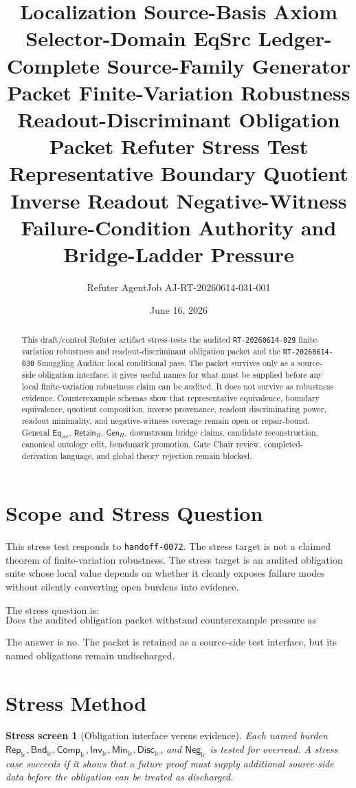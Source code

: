 \documentclass[11pt]{article}
\title{\textbf{Localization Source-Basis Axiom Selector-Domain EqSrc Ledger-Complete Source-Family Generator Packet Finite-Variation Robustness Readout-Discriminant Obligation Packet Refuter Stress Test}\\[0.35em]
\large Representative Boundary Quotient Inverse Readout Negative-Witness Failure-Condition Authority and Bridge-Ladder Pressure}
\author{Refuter AgentJob AJ-RT-20260614-031-001}
\date{June 16, 2026}
\newcommand{\EqSrc}{\mathsf{Eq}_{\mathrm{src}}}
\newcommand{\RepLC}{\mathsf{Rep}_{\mathrm{lc}}}
\newcommand{\BndLC}{\mathsf{Bnd}_{\mathrm{lc}}}
\newcommand{\CompLC}{\mathsf{Comp}_{\mathrm{lc}}}
\newcommand{\InvLC}{\mathsf{Inv}_{\mathrm{lc}}}
\newcommand{\MinLC}{\mathsf{Min}_{\mathrm{lc}}}
\newcommand{\DiscLC}{\mathsf{Disc}_{\mathrm{lc}}}
\newcommand{\NegLC}{\mathsf{Neg}_{\mathrm{lc}}}
\newcommand{\RetainH}{\mathsf{Retain}_{H}}
\newcommand{\GenH}{\mathsf{Gen}_{H}}
\newtheorem{stressscreen}{Stress screen}
\begin{document}
\maketitle

\begin{abstract}
This draft/control Refuter artifact stress-tests the audited
\texttt{RT-20260614-029} finite-variation robustness and
readout-discriminant obligation packet and the \texttt{RT-20260614-030}
Smuggling Auditor local conditional pass. The packet survives only as
a source-side obligation interface: it gives useful names for what
must be supplied before any local finite-variation robustness claim can
be audited. It does not survive as robustness evidence. Counterexample
schemas show that representative equivalence, boundary equivalence,
quotient composition, inverse provenance, readout discriminating
power, readout minimality, and negative-witness coverage remain open or
repair-bound. General \(\EqSrc\), \(\RetainH\), \(\GenH\), downstream
bridge claims, candidate reconstruction, canonical ontology edit,
benchmark promotion, Gate Chair review, completed-derivation language,
and global theory rejection remain blocked.
\end{abstract}

\section{Scope and Stress Question}

This stress test responds to \texttt{handoff-0072}. The stress target
is not a claimed theorem of finite-variation robustness. The stress
target is an audited obligation suite whose local value depends on
whether it cleanly exposes failure modes without silently converting
open burdens into evidence.

The stress question is:
\[
    \text{Does the audited obligation packet withstand counterexample
    pressure as robustness or readout-discriminant evidence?}
\]

The answer is no. The packet is retained as a source-side test
interface, but its named obligations remain undischarged.

\section{Stress Method}

\begin{stressscreen}[Obligation interface versus evidence]
Each named burden \(\RepLC,\BndLC,\CompLC,\InvLC,\MinLC,\DiscLC\),
and \(\NegLC\) is tested for overread. A stress case succeeds if it
shows that a future proof must supply additional source-side data
before the obligation can be treated as discharged.
\end{stressscreen}
\end{document}
